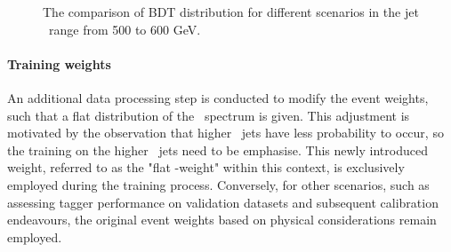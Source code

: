 \begin{figure}[htb]
	\centering
	 \quad
	\caption[]{
		The comparison of BDT distribution for different scenarios in the jet \pt~range from 500 to 600 GeV. %
		\label{fig:QG-training_scenario_compare_500_600}
	}
\end{figure}

\paragraph{Training weights}\mbox{}\par
An additional data processing step is conducted to modify the event weights, such that a flat distribution of the \pt~spectrum is given. 
This adjustment is motivated by the observation that higher \pt~jets have less probability to occur, so the training on the higher \pt~jets need to be emphasise. This newly introduced weight, referred to as the "flat \pt-weight" within this context, is exclusively employed during the training process. Conversely, for other scenarios, such as assessing tagger performance on validation datasets and subsequent calibration endeavours, the original event weights based on physical considerations remain employed.

